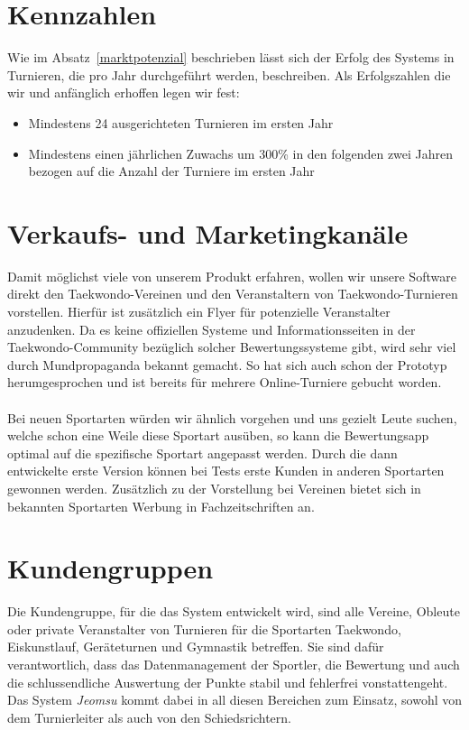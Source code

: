 \section{Kennzahlen}

Wie im Absatz~\ref{marktpotenzial} beschrieben lässt sich der Erfolg des Systems in Turnieren, die pro Jahr
durchgeführt werden, beschreiben.
Als Erfolgszahlen die wir und anfänglich erhoffen legen wir fest:
\begin{itemize}
	\item Mindestens 24 ausgerichteten Turnieren im ersten Jahr
	\item Mindestens einen jährlichen Zuwachs um 300\% in den folgenden zwei Jahren bezogen auf die Anzahl der
	Turniere im ersten Jahr
\end{itemize}

\section{Verkaufs- und Marketingkanäle}

Damit möglichst viele von unserem Produkt erfahren, wollen wir unsere Software direkt den Taekwondo-Vereinen und
den Veranstaltern von Taekwondo-Turnieren vorstellen.
Hierfür ist zusätzlich ein Flyer für potenzielle Veranstalter anzudenken.
Da es keine offiziellen Systeme und Informationsseiten in der Taekwondo-Community bezüglich solcher Bewertungssysteme
gibt, wird sehr viel durch Mundpropaganda bekannt gemacht.
So hat sich auch schon der Prototyp herumgesprochen und ist bereits für mehrere Online-Turniere gebucht worden.
\\\\
Bei neuen Sportarten würden wir ähnlich vorgehen und uns gezielt Leute suchen, welche schon eine Weile diese Sportart
	ausüben, so kann die Bewertungsapp optimal auf die spezifische Sportart angepasst werden.
Durch die dann entwickelte erste Version können bei Tests erste Kunden in anderen Sportarten gewonnen werden.
Zusätzlich zu der Vorstellung bei Vereinen bietet sich in bekannten Sportarten Werbung in Fachzeitschriften an.

\section{Kundengruppen}

Die Kundengruppe, für die das System entwickelt wird, sind alle Vereine, Obleute oder private Veranstalter von
	Turnieren für die Sportarten Taekwondo, Eiskunstlauf, Geräteturnen und Gymnastik betreffen.
Sie sind dafür verantwortlich, dass das Datenmanagement der Sportler, die Bewertung und auch die schlussendliche
	Auswertung der Punkte stabil und fehlerfrei vonstattengeht.
Das System \textit{Jeomsu} kommt dabei in all diesen Bereichen zum Einsatz, sowohl von dem Turnierleiter als auch von
	den Schiedsrichtern.